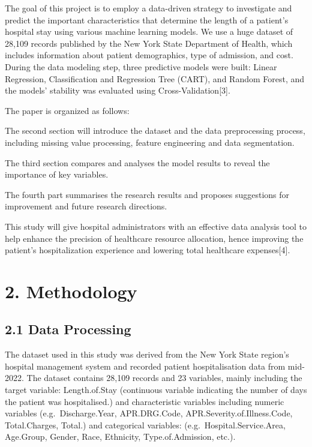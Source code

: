 \documentclass[
  10pt,
]{article}
\begin{document}
The goal of this project is to employ a data-driven strategy to
investigate and predict the important characteristics that determine the
length of a patient's hospital stay using various machine learning
models. We use a huge dataset of 28,109 records published by the New
York State Department of Health, which includes information about
patient demographics, type of admission, and cost. During the data
modeling step, three predictive models were built: Linear Regression,
Classification and Regression Tree (CART), and Random Forest, and the
models' stability was evaluated using Cross-Validation{[}3{]}.

The paper is organized as follows:

The second section will introduce the dataset and the data preprocessing
process, including missing value processing, feature engineering and
data segmentation.

The third section compares and analyses the model results to reveal the
importance of key variables.

The fourth part summarises the research results and proposes suggestions
for improvement and future research directions.

This study will give hospital administrators with an effective data
analysis tool to help enhance the precision of healthcare resource
allocation, hence improving the patient's hospitalization experience and
lowering total healthcare expenses{[}4{]}.

\section{2. Methodology}\label{methodology}

\subsection{2.1 Data Processing}\label{data-processing}

The dataset used in this study was derived from the New York State
region's hospital management system and recorded patient hospitalisation
data from mid-2022. The dataset contains 28,109 records and 23
variables, mainly including the target variable: Length.of.Stay
(continuous variable indicating the number of days the patient was
hospitalised.) and characteristic variables including numeric variables
(e.g.~Discharge.Year, APR.DRG.Code, APR.Severity.of.Illness.Code,
Total.Charges, Total.) and categorical variables:
(e.g.~Hospital.Service.Area, Age.Group, Gender, Race, Ethnicity,
Type.of.Admission, etc.).
\end{document}
